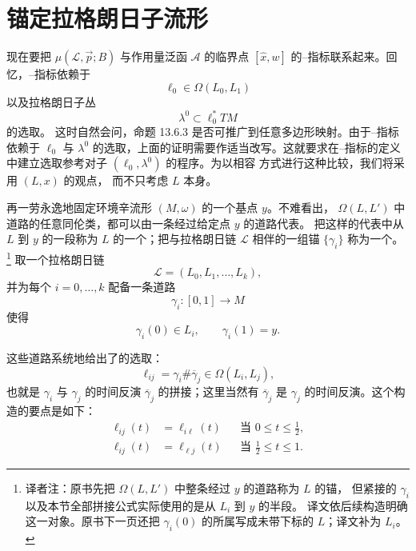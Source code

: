 \section{锚定拉格朗日子流形}
\label{sec:anchored-lagrangian-submanifolds}

现在要把 $\mu(\mathcal L,\vec p;B)$ 与作用量泛函 $\mathcal A$ 的临界点
$[\widehat x,w]$ 的\personMaslov{}--\personMorse{}指标联系起来。回忆，\personMaslov{}--\personMorse{}指标依赖于\termBasePath{}
\[
  \ell_0\in\Omega(L_0,L_1)
\]
以及拉格朗日子丛
\[
  \lambda^0\subset\ell_0^*TM
\]
的选取。
这时自然会问，命题 13.6.3 是否可推广到任意多边形映射。由于\personMaslov{}--\personMorse{}指标依赖于 $\ell_0$ 与 $\lambda^0$ 的选取，上面的证明需要作适当改写。这就要求在\personMaslov{}--\personMorse{}指标的定义中建立选取参考对子 $(\ell_0,\lambda^0)$ 的程序。为以相容
方式进行这种比较，我们将采用\emph{\termPointedLagrangianSubmanifold{}} $(L,x)$ 的观点，
而不只考虑 $L$ 本身。

再一劳永逸地固定环境辛流形 $(M,\omega)$ 的一个基点 $y$。不难看出，
$\Omega(L,L')$ 中道路的任意同伦类，都可以由一条经过给定点 $y$ 的道路代表。
把这样的代表中从 $L$ 到 $y$ 的一段称为 $L$ 的一个\termAnchor{}；把与拉格朗日链
$\mathcal L$ 相伴的一组锚 $\{\gamma_i\}$ 称为一个\termAnchorSystem{}。
\footnote{译者注：原书先把 $\Omega(L,L')$ 中整条经过 $y$ 的道路称为 $L$ 的锚，
但紧接的 $\gamma_i$ 以及本节全部拼接公式实际使用的是从 $L_i$ 到 $y$ 的半段。
译文依后续构造明确这一对象。原书下一页还把 $\gamma_i(0)$ 的所属写成未带下标的
$L$；译文补为 $L_i$。}
取一个拉格朗日链
\[
  \mathcal L=(L_0,L_1,\ldots,L_k),
\]
并为每个 $i=0,\ldots,k$ 配备一条道路
\[
  \gamma_i:[0,1]\longrightarrow M
\]
使得
\[
  \gamma_i(0)\in L_i,
  \qquad
  \gamma_i(1)=y.
\]

这些道路系统地给出了\termBasePath{}的选取：
\[
  \ell_{ij}=\gamma_i\#\overline\gamma_j
  \in\Omega(L_i,L_j),
\]
也就是 $\gamma_i$ 与 $\gamma_j$ 的时间反演 $\overline\gamma_j$ 的拼接；这里当然有
$\overline\gamma_j$ 是 $\gamma_j$ 的时间反演。这个构造的要点是如下\termOverlappingProperty{}：
\begin{equation}
  \begin{aligned}
    \ell_{ij}(t)&=\ell_{i\ell}(t)
      &&\text{当 }0\leq t\leq\frac12,\\
    \ell_{ij}(t)&=\ell_{\ell j}(t)
      &&\text{当 }\frac12\leq t\leq1.
  \end{aligned}
\label{eq:anchor-base-path-overlap}
\end{equation}

